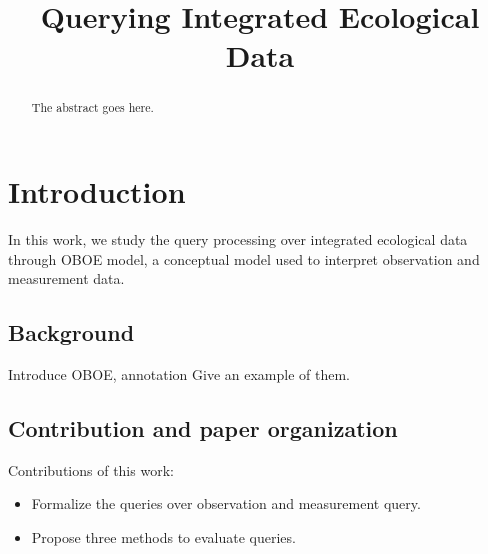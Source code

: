 \documentclass[conference]{IEEEtran}
\begin{document}
\title{Querying Integrated Ecological Data}

\author{
\and
{}
\and
{}
}

\maketitle


\begin{abstract}
The abstract goes here.
\end{abstract}


\section{Introduction}
In this work, we study the query processing over integrated ecological
data through OBOE model\cite{DBLP:conf/er/BowersMS08}, a conceptual model used to interpret
observation and measurement data. 

\subsection{Background}
Introduce OBOE, annotation
Give an example of them.

\subsection{Contribution and paper organization}
Contributions of this work:
\begin{itemize}
\item Formalize the queries over observation and measurement query.
\item Propose three methods to evaluate queries. 
\end{itemize}
\end{document}
